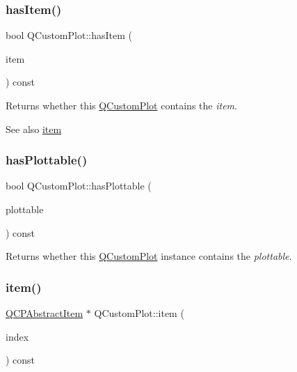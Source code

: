 \subsubsection{\texorpdfstring{has\+Item()}{hasItem()}}
{\footnotesize\ttfamily bool Q\+Custom\+Plot\+::has\+Item (\begin{DoxyParamCaption}\item[{\hyperlink{class_q_c_p_abstract_item}{Q\+C\+P\+Abstract\+Item} $\ast$}]{item }\end{DoxyParamCaption}) const}

Returns whether this \hyperlink{class_q_custom_plot}{Q\+Custom\+Plot} contains the {\itshape item}.

\begin{DoxySeeAlso}{See also}
\hyperlink{class_q_custom_plot_ac042f2e78edd228ccf2f26b7fe215239}{item} 
\end{DoxySeeAlso}
\mbox{\label{class_q_custom_plot_a72cefbfbb9e699940e37be605bd9c51e}} 
\subsubsection{\texorpdfstring{has\+Plottable()}{hasPlottable()}}
{\footnotesize\ttfamily bool Q\+Custom\+Plot\+::has\+Plottable (\begin{DoxyParamCaption}\item[{\hyperlink{class_q_c_p_abstract_plottable}{Q\+C\+P\+Abstract\+Plottable} $\ast$}]{plottable }\end{DoxyParamCaption}) const}

Returns whether this \hyperlink{class_q_custom_plot}{Q\+Custom\+Plot} instance contains the {\itshape plottable}. \mbox{\label{class_q_custom_plot_ac042f2e78edd228ccf2f26b7fe215239}} 
\subsubsection{\texorpdfstring{item()}{item()}\hspace{0.1cm}{\footnotesize\ttfamily [1/2]}}
{\footnotesize\ttfamily \hyperlink{class_q_c_p_abstract_item}{Q\+C\+P\+Abstract\+Item} $\ast$ Q\+Custom\+Plot\+::item (\begin{DoxyParamCaption}\item[{int}]{index }\end{DoxyParamCaption}) const}

